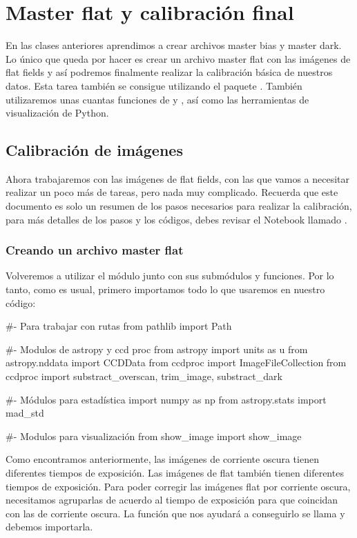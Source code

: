 \chapter{Master flat y calibración final}
\setcounter{ipythcntr}{0}

En las clases anteriores aprendimos a crear archivos master bias y master dark. Lo único que queda por hacer es crear un archivo master flat con las imágenes de flat fields y así podremos finalmente realizar la calibración básica de nuestros datos. Esta tarea también se consigue utilizando el paquete . También utilizaremos unas cuantas funciones de  y , así como las herramientas de visualización de Python.  

\section{Calibración de imágenes}
Ahora trabajaremos con las imágenes de flat fields, con las que vamos a necesitar realizar un poco más de tareas, pero nada muy complicado. Recuerda que este documento es solo un resumen de los pasos necesarios para realizar la calibración, para más detalles de los pasos y los códigos, debes revisar el Notebook llamado . 

\subsection{Creando un archivo master flat}
Volveremos a utilizar el módulo  junto con sus submódulos y funciones. Por lo tanto, como es usual, primero importamos todo lo que usaremos en nuestro código:

\begin{pyin}[]
#- Para trabajar con rutas
from pathlib import Path

#- Modulos de astropy y ccd proc
from astropy import units as u
from astropy.nddata import CCDData
from ccdproc import ImageFileCollection
from  ccdproc import substract_overscan, trim_image, substract_dark

#- Módulos para estadística
import numpy as np
from astropy.stats import mad_std

#- Modulos para visualización
from show_image import show_image 
\end{pyin}

Como encontramos anteriormente, las imágenes de corriente oscura tienen diferentes tiempos de exposición. Las imágenes de flat también tienen diferentes tiempos de exposición. Para poder corregir las imágenes flat por corriente oscura, necesitamos agruparlas de acuerdo al tiempo de exposición para que coincidan con las de corriente oscura. La función que nos ayudará a conseguirlo se llama  y debemos importarla.

